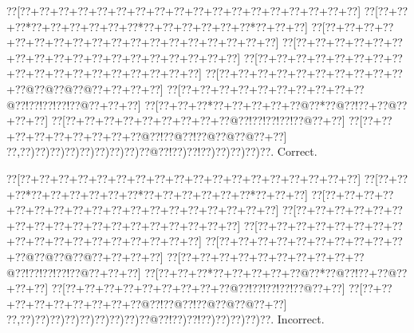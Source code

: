 \documentclass[a5paper]{article}
\begin{document}
\begin{center}
{\goo
\0??[\0??+\0??+\0??+\0??+\0??+\0??+\0??+\0??+\0??+\0??+\0??+\0??+\0??+\0??+\0??+\0??+\0??+\0??]
\0??[\0??+\0??+\0??*\0??+\0??+\0??+\0??+\0??+\0??*\0??+\0??+\0??+\0??+\0??+\0??*\0??+\0??+\0??]
\0??[\0??+\0??+\0??+\0??+\0??+\0??+\0??+\0??+\0??+\0??+\0??+\0??+\0??+\0??+\0??+\0??+\0??+\0??]
\0??[\0??+\0??+\0??+\0??+\0??+\0??+\0??+\0??+\0??+\0??+\0??+\0??+\0??+\0??+\0??+\0??+\0??+\0??]
\0??[\0??+\0??+\0??+\0??+\0??+\0??+\0??+\0??+\0??+\0??+\0??+\0??+\0??+\0??+\0??+\0??+\0??+\0??]
\0??[\0??+\0??+\0??+\0??+\0??+\0??+\0??+\0??+\0??+\0??+\0??@\0??@\0??@\0??@\0??+\0??+\0??+\0??]
\0??[\0??+\0??+\0??+\0??+\0??+\0??+\0??+\0??+\0??+\0??@\0??!\0??!\0??!\0??!\0??@\0??+\0??+\0??]
\0??[\0??+\0??+\0??*\0??+\0??+\0??+\0??+\0??@\0??*\0??@\0??!\0??+\0??@\0??+\0??+\0??]
\0??[\0??+\0??+\0??+\0??+\0??+\0??+\0??+\0??+\0??@\0??!\0??!\0??!\0??!\0??@\0??+\0??]
\0??[\0??+\0??+\0??+\0??+\0??+\0??+\0??+\0??+\0??@\0??!\0??@\0??!\0??@\0??@\0??@\0??+\0??]
\0??,\0??)\0??)\0??)\0??)\0??)\0??)\0??)\0??)\0??@\0??!\0??)\0??!\0??)\0??)\0??)\0??)\0??.
}
Correct. 

\end{center}
\begin{center}
{\goo
\0??[\0??+\0??+\0??+\0??+\0??+\0??+\0??+\0??+\0??+\0??+\0??+\0??+\0??+\0??+\0??+\0??+\0??+\0??]
\0??[\0??+\0??+\0??*\0??+\0??+\0??+\0??+\0??+\0??*\0??+\0??+\0??+\0??+\0??+\0??*\0??+\0??+\0??]
\0??[\0??+\0??+\0??+\0??+\0??+\0??+\0??+\0??+\0??+\0??+\0??+\0??+\0??+\0??+\0??+\0??+\0??+\0??]
\0??[\0??+\0??+\0??+\0??+\0??+\0??+\0??+\0??+\0??+\0??+\0??+\0??+\0??+\0??+\0??+\0??+\0??+\0??]
\0??[\0??+\0??+\0??+\0??+\0??+\0??+\0??+\0??+\0??+\0??+\0??+\0??+\0??+\0??+\0??+\0??+\0??+\0??]
\0??[\0??+\0??+\0??+\0??+\0??+\0??+\0??+\0??+\0??+\0??+\0??@\0??@\0??@\0??@\0??+\0??+\0??+\0??]
\0??[\0??+\0??+\0??+\0??+\0??+\0??+\0??+\0??+\0??+\0??@\0??!\0??!\0??!\0??!\0??@\0??+\0??+\0??]
\0??[\0??+\0??+\0??*\0??+\0??+\0??+\0??+\0??@\0??*\0??@\0??!\0??+\0??@\0??+\0??+\0??]
\0??[\0??+\0??+\0??+\0??+\0??+\0??+\0??+\0??+\0??@\0??!\0??!\0??!\0??!\0??@\0??+\0??]
\0??[\0??+\0??+\0??+\0??+\0??+\0??+\0??+\0??+\0??@\0??!\0??@\0??!\0??@\0??@\0??@\0??+\0??]
\0??,\0??)\0??)\0??)\0??)\0??)\0??)\0??)\0??)\0??@\0??!\0??)\0??!\0??)\0??)\0??)\0??)\0??.
}
Incorrect. 

\end{center}
\newpage
\end{document}
